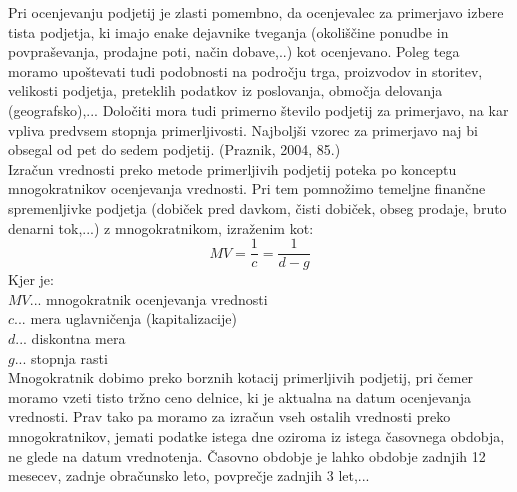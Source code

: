 \documentclass[12pt,a4paper]{amsart}
\theoremstyle{definition} %
\theoremstyle{plain} %
\begin{document}
Pri ocenjevanju podjetij je zlasti pomembno, da ocenjevalec za primerjavo izbere tista podjetja, ki imajo enake dejavnike tveganja (okoliščine ponudbe in povpraševanja, prodajne poti, način dobave,..) kot ocenjevano. Poleg tega moramo upoštevati tudi podobnosti na področju trga, proizvodov in storitev, velikosti podjetja, preteklih podatkov iz poslovanja, območja delovanja (geografsko),... Določiti mora tudi primerno število podjetij za primerjavo, na kar vpliva predvsem stopnja primerljivosti. Najboljši vzorec za primerjavo naj bi obsegal od pet do sedem podjetij. (Praznik, 2004, 85.)\\
Izračun vrednosti preko metode primerljivih podjetij poteka po konceptu mnogokratnikov ocenjevanja vrednosti. Pri tem pomnožimo temeljne finančne spremenljivke podjetja (dobiček pred davkom, čisti dobiček, obseg prodaje, bruto denarni tok,...) z mnogokratnikom, izraženim kot:
\begin{equation}
MV=\frac{1}{c}=\frac{1}{d-g}
\end{equation}
Kjer je:\\
$MV$... mnogokratnik ocenjevanja vrednosti\\
$c$... mera uglavničenja (kapitalizacije)\\
$d$... diskontna mera\\
$g$... stopnja rasti\\
Mnogokratnik dobimo preko borznih kotacij primerljivih podjetij, pri čemer moramo vzeti tisto tržno ceno delnice, ki je aktualna na datum ocenjevanja vrednosti. Prav tako  pa moramo za izračun vseh ostalih vrednosti preko mnogokratnikov, jemati podatke istega dne oziroma iz istega časovnega obdobja, ne glede na datum vrednotenja. Časovno obdobje je lahko obdobje zadnjih 12 mesecev, zadnje obračunsko leto, povprečje zadnjih 3 let,...
\end{document}
